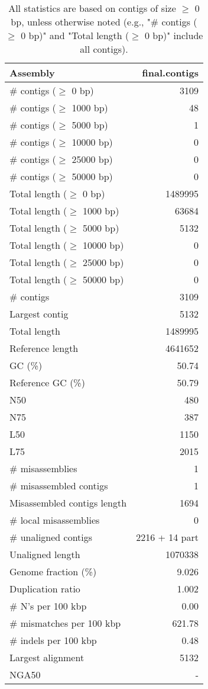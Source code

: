 \documentclass[12pt,a4paper]{article}
\begin{document}
\begin{table}[ht]
\begin{center}
\caption{All statistics are based on contigs of size $\geq$ 0 bp, unless otherwise noted (e.g., "\# contigs ($\geq$ 0 bp)" and "Total length ($\geq$ 0 bp)" include all contigs).}
\begin{tabular}{|l*{1}{|r}|}
\hline
Assembly & final.contigs \\ \hline
\# contigs ($\geq$ 0 bp) & 3109 \\ \hline
\# contigs ($\geq$ 1000 bp) & 48 \\ \hline
\# contigs ($\geq$ 5000 bp) & 1 \\ \hline
\# contigs ($\geq$ 10000 bp) & 0 \\ \hline
\# contigs ($\geq$ 25000 bp) & 0 \\ \hline
\# contigs ($\geq$ 50000 bp) & 0 \\ \hline
Total length ($\geq$ 0 bp) & 1489995 \\ \hline
Total length ($\geq$ 1000 bp) & 63684 \\ \hline
Total length ($\geq$ 5000 bp) & 5132 \\ \hline
Total length ($\geq$ 10000 bp) & 0 \\ \hline
Total length ($\geq$ 25000 bp) & 0 \\ \hline
Total length ($\geq$ 50000 bp) & 0 \\ \hline
\# contigs & 3109 \\ \hline
Largest contig & 5132 \\ \hline
Total length & 1489995 \\ \hline
Reference length & 4641652 \\ \hline
GC (\%) & 50.74 \\ \hline
Reference GC (\%) & 50.79 \\ \hline
N50 & 480 \\ \hline
N75 & 387 \\ \hline
L50 & 1150 \\ \hline
L75 & 2015 \\ \hline
\# misassemblies & 1 \\ \hline
\# misassembled contigs & 1 \\ \hline
Misassembled contigs length & 1694 \\ \hline
\# local misassemblies & 0 \\ \hline
\# unaligned contigs & 2216 + 14 part \\ \hline
Unaligned length & 1070338 \\ \hline
Genome fraction (\%) & 9.026 \\ \hline
Duplication ratio & 1.002 \\ \hline
\# N's per 100 kbp & 0.00 \\ \hline
\# mismatches per 100 kbp & 621.78 \\ \hline
\# indels per 100 kbp & 0.48 \\ \hline
Largest alignment & 5132 \\ \hline
NGA50 & - \\ \hline
\end{tabular}
\end{center}
\end{table}
\end{document}
